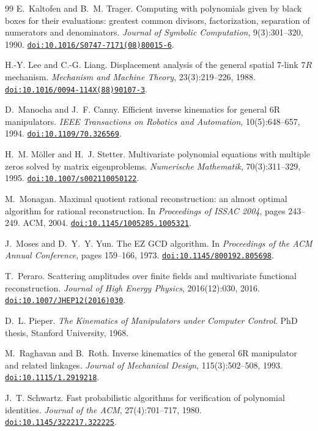 \documentclass[11pt,a4paper]{article}
\theoremstyle{plain}
\theoremstyle{definition}
\theoremstyle{remark}
\newcommand{\doi}[1]{\href{https://doi.org/#1}{\nolinkurl{doi:#1}}}
\begin{document}
\begin{thebibliography}{99}
E.~Kaltofen and B.~M. Trager.
\newblock Computing with polynomials given by black boxes for their evaluations: greatest common
divisors, factorization, separation of numerators and denominators.
\newblock \emph{Journal of Symbolic Computation}, 9(3):301--320, 1990.
\newblock \doi{10.1016/S0747-7171(08)80015-6}.

H.-Y. Lee and C.-G. Liang.
\newblock Displacement analysis of the general spatial 7-link $7R$ mechanism.
\newblock \emph{Mechanism and Machine Theory}, 23(3):219--226, 1988.
\newblock \doi{10.1016/0094-114X(88)90107-3}.

D.~Manocha and J.~F. Canny.
\newblock Efficient inverse kinematics for general 6R manipulators.
\newblock \emph{IEEE Transactions on Robotics and Automation}, 10(5):648--657, 1994.
\newblock \doi{10.1109/70.326569}.

H.~M. M\"oller and H.~J. Stetter.
\newblock Multivariate polynomial equations with multiple zeros solved by matrix eigenproblems.
\newblock \emph{Numerische Mathematik}, 70(3):311--329, 1995.
\newblock \doi{10.1007/s002110050122}.

M.~Monagan.
\newblock Maximal quotient rational reconstruction: an almost optimal algorithm for rational
reconstruction.
\newblock In \emph{Proceedings of ISSAC 2004}, pages 243--249. ACM, 2004.
\newblock \doi{10.1145/1005285.1005321}.

J.~Moses and D.~Y.~Y. Yun.
\newblock The EZ GCD algorithm.
\newblock In \emph{Proceedings of the ACM Annual Conference}, pages 159--166, 1973.
\newblock \doi{10.1145/800192.805698}.

T.~Peraro.
\newblock Scattering amplitudes over finite fields and multivariate functional reconstruction.
\newblock \emph{Journal of High Energy Physics}, 2016(12):030, 2016.
\newblock \doi{10.1007/JHEP12(2016)030}.

D.~L. Pieper.
\newblock \emph{The Kinematics of Manipulators under Computer Control}.
\newblock PhD thesis, Stanford University, 1968.

M.~Raghavan and B.~Roth.
\newblock Inverse kinematics of the general 6R manipulator and related linkages.
\newblock \emph{Journal of Mechanical Design}, 115(3):502--508, 1993.
\newblock \doi{10.1115/1.2919218}.

J.~T. Schwartz.
\newblock Fast probabilistic algorithms for verification of polynomial identities.
\newblock \emph{Journal of the ACM}, 27(4):701--717, 1980.
\newblock \doi{10.1145/322217.322225}.


\end{thebibliography}
\end{document}
